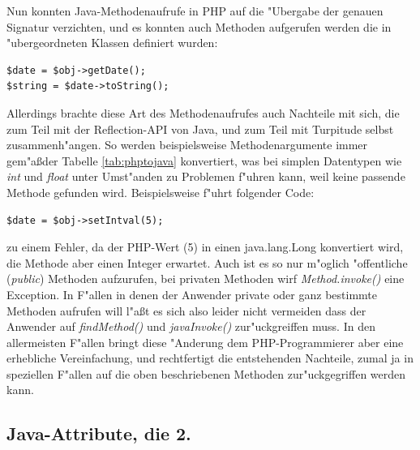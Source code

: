 Nun konnten Java-Methodenaufrufe in PHP auf die "Ubergabe der genauen Signatur verzichten, und es konnten auch Methoden aufgerufen
werden die in "ubergeordneten Klassen definiert wurden:
\begin{lstlisting}[caption=Verbesserter Aufruf einer Java-Methode]
$date = $obj->getDate();
$string = $date->toString();
\end{lstlisting}
Allerdings brachte diese Art des Methodenaufrufes auch Nachteile mit sich, die zum Teil mit der Reflection-API von Java,
und zum Teil mit Turpitude selbst zusammenh"angen. So werden beispielsweise Methodenargumente immer gem"a\ss  der Tabelle
\ref{tab:phptojava} konvertiert, was bei simplen Datentypen wie \emph{int} und \emph{float} unter Umst"anden zu Problemen f"uhren
kann, weil keine passende Methode gefunden wird. Beispielsweise f"uhrt folgender Code:
\begin{lstlisting}[caption=Typkonversionsfehler]
$date = $obj->setIntval(5);
\end{lstlisting}
zu einem Fehler, da der PHP-Wert (5) in einen java.lang.Long konvertiert wird, die Methode aber einen Integer erwartet.
Auch ist es so nur m"oglich "offentliche (\emph{public}) Methoden aufzurufen,
bei privaten Methoden wirf \emph{Method.invoke()} eine Exception.
In F"allen in denen der Anwender private oder ganz bestimmte Methoden aufrufen will l"a\ss t es sich also leider nicht vermeiden dass 
der Anwender auf \emph{findMethod()} und \emph{javaInvoke()} zur"uckgreiffen muss. In den allermeisten F"allen bringt diese "Anderung 
dem PHP-Programmierer aber eine erhebliche Vereinfachung, und rechtfertigt die entstehenden Nachteile, zumal ja in speziellen F"allen
auf die oben beschriebenen Methoden zur"uckgegriffen werden kann.

\subsection{Java-Attribute, die 2.}
\label{sec:chap1:impl:14}

